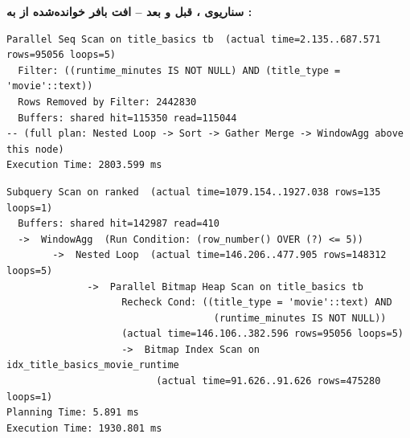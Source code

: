 \textbf{سناریوی ، قبل و بعد -- افت بافر خوانده‌شده از  به :}

\begin{latin}
\begin{lstlisting}[caption={results/explain/scenario\_08.txt -- BEFORE, main node only (excerpt)}]
Parallel Seq Scan on title_basics tb  (actual time=2.135..687.571 rows=95056 loops=5)
  Filter: ((runtime_minutes IS NOT NULL) AND (title_type = 'movie'::text))
  Rows Removed by Filter: 2442830
  Buffers: shared hit=115350 read=115044
-- (full plan: Nested Loop -> Sort -> Gather Merge -> WindowAgg above this node)
Execution Time: 2803.599 ms
\end{lstlisting}
\begin{lstlisting}[caption={results/explain/scenario\_08.after.txt (excerpt)}]
Subquery Scan on ranked  (actual time=1079.154..1927.038 rows=135 loops=1)
  Buffers: shared hit=142987 read=410
  ->  WindowAgg  (Run Condition: (row_number() OVER (?) <= 5))
        ->  Nested Loop  (actual time=146.206..477.905 rows=148312 loops=5)
              ->  Parallel Bitmap Heap Scan on title_basics tb
                    Recheck Cond: ((title_type = 'movie'::text) AND
                                    (runtime_minutes IS NOT NULL))
                    (actual time=146.106..382.596 rows=95056 loops=5)
                    ->  Bitmap Index Scan on idx_title_basics_movie_runtime
                          (actual time=91.626..91.626 rows=475280 loops=1)
Planning Time: 5.891 ms
Execution Time: 1930.801 ms
\end{lstlisting}
\end{latin}
